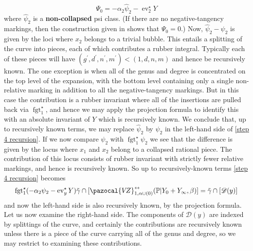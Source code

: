 \documentclass[11pt]{amsart}
\newcommand{\VZ}{\pazocal{V\!Z}}
\newcommand{\st}{\star}
\newcommand{\ev}{\operatorname{ev}}
\newcommand{\fgt}{\operatorname{fgt}}
\newcommand{\Dcal}{\mathcal{D}}
\theoremstyle{definition}
\theoremstyle{definition}
\begin{document}
\begin{equation*}\label{Psi0 formula} \Psi_0 = -\alpha_2 \hat\psi_2 - \ev_2^\st Y \end{equation*}
where $\hat\psi_2$ is a \textbf{non-collapsed} psi class. (If there are no negative-tangency markings, then the construction given in \cite[\S 1.5.2]{MaulikPandharipande} shows that $\Psi_0=0$.) Now, $\hat\psi_2 - \psi_2$ is given by the loci where $x_2$ belongs to a trivial bubble. This entails a splitting of the curve into pieces, each of which contributes a rubber integral. Typically each of these pieces will have $(g^\prime,d^\prime,n^\prime,m^\prime) < (1,d,n,m)$ and hence be recursively known. The one exception is when all of the genus and degree is concentrated on the top level of the expansion, with the bottom level containing only a single non-relative marking in addition to all the negative-tangency markings. But in this case the contribution is a rubber invariant where all of the insertions are pulled back via $\fgt_1^\st$, and hence we may apply the projection formula to identify this with an absolute invariant of $Y$ which is recursively known. We conclude that, up to recursively known terms, we may replace $\hat\psi_2$ by $\psi_2$ in the left-hand side of \eqref{step 4 recursion}. If we now compare $\psi_2$ with $\fgt_1^\st \psi_2$ we see that the difference is given by the locus where $x_1$ and $x_2$ belong to a collapsed rational piece. The contribution of this locus consists of rubber invariant with strictly fewer relative markings, and hence is recursively known. So up to recursively-known terms \eqref{step 4 recursion} becomes
\begin{equation*} \fgt_1^\st (-\alpha_2\psi_2 - \ev_y^\st Y)\tilde\gamma \cap [\VZ^{\leftrightarrow}_{1,\alpha\cup(0)}(\mathbb P|Y_0+Y_\infty,\beta)] = \tilde\gamma\cap[\Dcal(y)]\end{equation*}
and now the left-hand side is also recursively known, by the projection formula. Let us now examine the right-hand side. The components of $\Dcal(y)$ are indexed by splittings of the curve, and certainly the contributions are recursively known unless there is a piece of the curve carrying all of the genus and degree, so we may restrict to examining these contributions.
\end{document}
